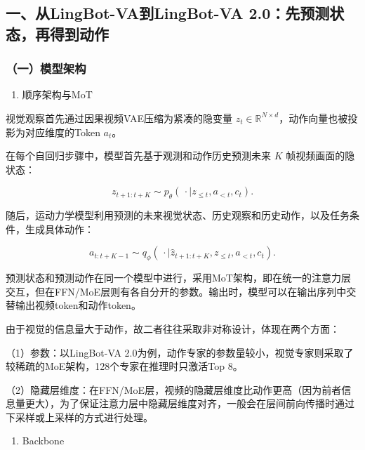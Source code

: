 \hypertarget{ux4e00ux4ecelingbot-vaux5230lingbot-va-2.0ux5148ux9884ux6d4bux72b6ux6001ux518dux5f97ux5230ux52a8ux4f5c}{%
\subsection{一、从LingBot-VA到LingBot-VA 2.0：先预测状态，再得到动作}\label{ux4e00ux4ecelingbot-vaux5230lingbot-va-2.0ux5148ux9884ux6d4bux72b6ux6001ux518dux5f97ux5230ux52a8ux4f5c}}

\hypertarget{ux4e00ux6a21ux578bux67b6ux6784-1}{%
\subsubsection{（一）模型架构}\label{ux4e00ux6a21ux578bux67b6ux6784-1}}

\begin{enumerate}
\def\labelenumi{\arabic{enumi}.}
\tightlist
\item
  顺序架构与MoT
\end{enumerate}

视觉观察首先通过因果视频VAE压缩为紧凑的隐变量 \(z_t\in\mathbb{R}^{N\times d}\)，动作向量也被投影为对应维度的Token \(a_t\)。

在每个自回归步骤中，模型首先基于观测和动作历史预测未来 \(K\) 帧视频画面的隐状态：

\[
z_{t+1:t+K}\sim p_\theta\!\left(\,\cdot\mid z_{\leq t},a_{\lt t},c_t\right).
\]

随后，运动力学模型利用预测的未来视觉状态、历史观察和历史动作，以及任务条件，生成具体动作：

\[
a_{t:t+K-1}\sim q_\phi\!\left(\,\cdot\mid\hat{z}_{t+1:t+K},z_{\leq t},a_{\lt t},c_t\right).
\]

预测状态和预测动作在同一个模型中进行，采用MoT架构，即在统一的注意力层交互，但在FFN/MoE层则有各自分开的参数。输出时，模型可以在输出序列中交替输出视频token和动作token。

由于视觉的信息量大于动作，故二者往往采取非对称设计，体现在两个方面：

（1）参数：以LingBot-VA 2.0为例，动作专家的参数量较小，视觉专家则采取了较稀疏的MoE架构，128个专家在推理时只激活Top 8。

（2）隐藏层维度：在FFN/MoE层，视频的隐藏层维度比动作更高（因为前者信息量更大），为了保证注意力层中隐藏层维度对齐，一般会在层间前向传播时通过下采样或上采样的方式进行处理。

\begin{enumerate}
\def\labelenumi{\arabic{enumi}.}
\setcounter{enumi}{1}
\tightlist
\item
  Backbone
\end{enumerate}

